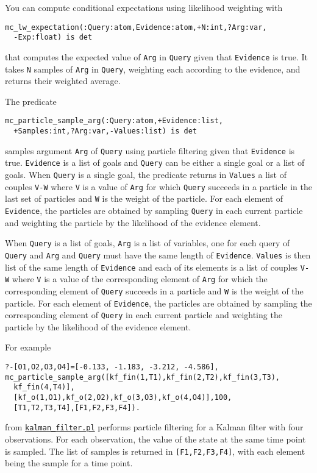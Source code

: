 You can compute conditional expectations using likelihood weighting with
\begin{verbatim}
mc_lw_expectation(:Query:atom,Evidence:atom,+N:int,?Arg:var,
  -Exp:float) is det
\end{verbatim}
that computes the expected value of \verb|Arg| in \verb|Query| given that
\verb|Evidence| is true.
It takes \verb|N| samples of  \verb|Arg| in \verb|Query|, weighting each according
to the evidence, and returns their weighted average.



The predicate
\begin{verbatim}
mc_particle_sample_arg(:Query:atom,+Evidence:list,
  +Samples:int,?Arg:var,-Values:list) is det
\end{verbatim}
samples argument \verb|Arg| of \verb|Query| using particle filtering
given that
\verb|Evidence|
is true. \verb|Evidence| is a list of goals and \verb|Query| can be either
a single goal or a list of goals.
When \verb|Query| is a single goal, the predicate returns in \verb|Values| a list of couples \verb|V-W| where
\verb|V| is a value of \verb|Arg| for which \verb|Query| succeeds in
a particle in the last set of particles and \verb|W| is the weight of the particle.
For each element of \verb|Evidence|, the particles are obtained by sampling \verb|Query|
in each current particle and weighting the particle by the likelihood of the evidence element.

When \verb|Query| is a list of goals,  \verb|Arg| is a list of variables, one for
each query of \verb|Query| and \verb|Arg| and \verb|Query| must have the same length of \verb|Evidence|.
\verb|Values| is then list of the same length of \verb|Evidence| and each of its
elements is a list of couples \verb|V-W| where
\verb|V| is a value of the corresponding element of \verb|Arg| for which the corresponding element of
\verb|Query| succeeds in
a particle and \verb|W| is the weight of the particle.
For each element of \verb|Evidence|, the particles are obtained by sampling the corresponding element of \verb|Query|
in each current particle and weighting the particle by the likelihood of the evidence element.


For example
\begin{verbatim}
?-[O1,O2,O3,O4]=[-0.133, -1.183, -3.212, -4.586],
mc_particle_sample_arg([kf_fin(1,T1),kf_fin(2,T2),kf_fin(3,T3),
  kf_fin(4,T4)],
  [kf_o(1,O1),kf_o(2,O2),kf_o(3,O3),kf_o(4,O4)],100,
  [T1,T2,T3,T4],[F1,F2,F3,F4]).
\end{verbatim}
from \href{http://cplint.eu/example/inference/kalman_filter.pl}{\texttt{kalman\_filter.pl}} performs
particle filtering for a Kalman filter with four observations. For each observation, the value of the state
at the same time point is sampled. The list of samples is returned in \verb|[F1,F2,F3,F4]|, with each element
being the sample for a time point.

